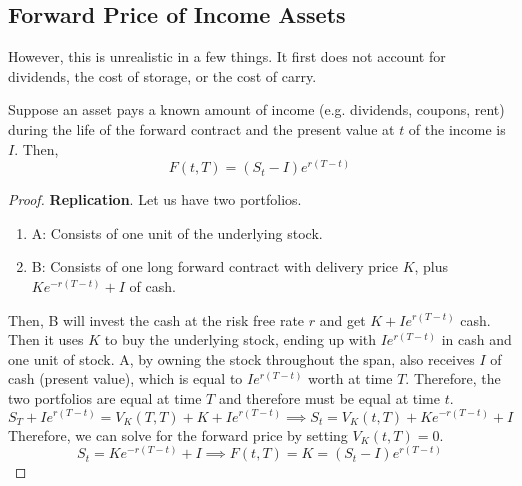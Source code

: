 \documentclass{article}
\begin{document}
  \subsection{Forward Price of Income Assets}

    However, this is unrealistic in a few things. It first does not account for dividends, the cost of storage, or the cost of carry. 

    \begin{theorem}
      Suppose an asset pays a known amount of income (e.g. dividends, coupons, rent) during the life of the forward contract and the present value at $t$ of the income is $I$. Then, 
      \begin{equation}
        F(t, T) = (S_t - I)e^{r(T - t)}
      \end{equation}
    \end{theorem}
    \begin{proof}
      \textbf{Replication}. Let us have two portfolios. 
      \begin{enumerate}
        \item A: Consists of one unit of the underlying stock. 
        \item B: Consists of one long forward contract with delivery price $K$, plus $K e^{-r(T - t)} + I$ of cash. 
      \end{enumerate}
      Then, B will invest the cash at the risk free rate $r$ and get $K + I e^{r(T - t)}$ cash. Then it uses $K$ to buy the underlying stock, ending up with $I e^{r(T - t)}$ in cash and one unit of stock. A, by owning the stock throughout the span, also receives $I$ of cash (present value), which is equal to $I e^{r(T - t)}$ worth at time $T$. Therefore, the two portfolios are equal at time $T$ and therefore must be equal at time $t$. 
      \begin{equation}
        S_T + I e^{r(T - t)} = V_K (T, T) + K + I e^{r(T - t)} \implies S_t = V_K (t, T) + K e^{-r(T - t)} + I
      \end{equation}
      Therefore, we can solve for the forward price by setting $V_K(t, T) = 0$. 
      \begin{equation}
        S_t = K e^{-r(T - t)} + I \implies F(t, T) = K = (S_t - I) e^{r(T - t)}
      \end{equation}
    \end{proof}
\end{document}
